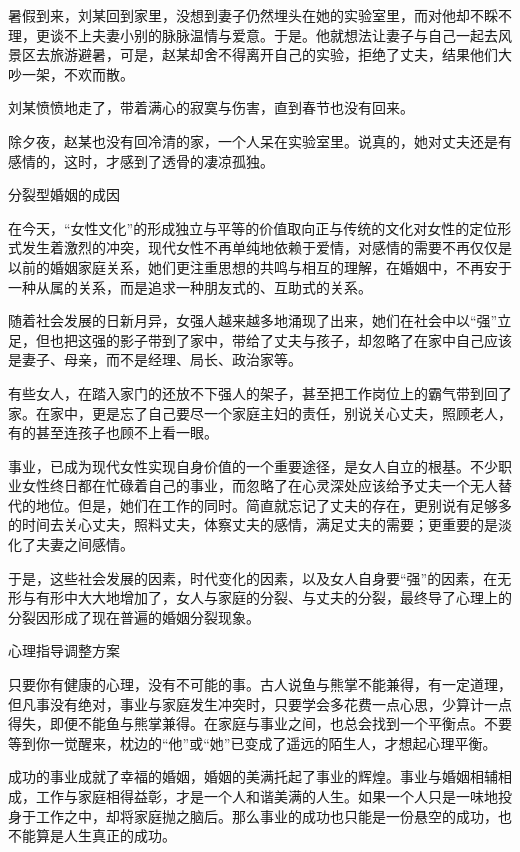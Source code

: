 \documentclass[12pt,UTF8]{ctexbook}
\begin{document}
暑假到来，刘某回到家里，没想到妻子仍然埋头在她的实验室里，而对他却不睬不理，更谈不上夫妻小别的脉脉温情与爱意。于是。他就想法让妻子与自己一起去风景区去旅游避暑，可是，赵某却舍不得离开自己的实验，拒绝了丈夫，结果他们大吵一架，不欢而散。

刘某愤愤地走了，带着满心的寂寞与伤害，直到春节也没有回来。

除夕夜，赵某也没有回冷清的家，一个人呆在实验室里。说真的，她对丈夫还是有感情的，这时，才感到了透骨的凄凉孤独。





分裂型婚姻的成因


在今天，“女性文化”的形成独立与平等的价值取向正与传统的文化对女性的定位形式发生着激烈的冲突，现代女性不再单纯地依赖于爱情，对感情的需要不再仅仅是以前的婚姻家庭关系，她们更注重思想的共鸣与相互的理解，在婚姻中，不再安于一种从属的关系，而是追求一种朋友式的、互助式的关系。

随着社会发展的日新月异，女强人越来越多地涌现了出来，她们在社会中以“强”立足，但也把这强的影子带到了家中，带给了丈夫与孩子，却忽略了在家中自己应该是妻子、母亲，而不是经理、局长、政治家等。

有些女人，在踏入家门的还放不下强人的架子，甚至把工作岗位上的霸气带到回了家。在家中，更是忘了自己要尽一个家庭主妇的责任，别说关心丈夫，照顾老人，有的甚至连孩子也顾不上看一眼。

事业，已成为现代女性实现自身价值的一个重要途径，是女人自立的根基。不少职业女性终日都在忙碌着自己的事业，而忽略了在心灵深处应该给予丈夫一个无人替代的地位。但是，她们在工作的同时。简直就忘记了丈夫的存在，更别说有足够多的时间去关心丈夫，照料丈夫，体察丈夫的感情，满足丈夫的需要；更重要的是淡化了夫妻之间感情。

于是，这些社会发展的因素，时代变化的因素，以及女人自身要“强”的因素，在无形与有形中大大地增加了，女人与家庭的分裂、与丈夫的分裂，最终导了心理上的分裂因形成了现在普遍的婚姻分裂现象。





心理指导调整方案


只要你有健康的心理，没有不可能的事。古人说鱼与熊掌不能兼得，有一定道理，但凡事没有绝对，事业与家庭发生冲突时，只要学会多花费一点心思，少算计一点得失，即便不能鱼与熊掌兼得。在家庭与事业之间，也总会找到一个平衡点。不要等到你一觉醒来，枕边的“他”或“她”已变成了遥远的陌生人，才想起心理平衡。

成功的事业成就了幸福的婚姻，婚姻的美满托起了事业的辉煌。事业与婚姻相辅相成，工作与家庭相得益彰，才是一个人和谐美满的人生。如果一个人只是一味地投身于工作之中，却将家庭抛之脑后。那么事业的成功也只能是一份悬空的成功，也不能算是人生真正的成功。
\end{document}
